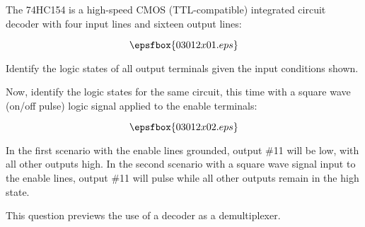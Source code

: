 

The 74HC154 is a high-speed CMOS (TTL-compatible) integrated circuit decoder with four input lines and sixteen output lines:

$$\epsfbox{03012x01.eps}$$

Identify the logic states of all output terminals given the input conditions shown.

\vskip 10pt

Now, identify the logic states for the same circuit, this time with a square wave (on/off pulse) logic signal applied to the enable terminals:

$$\epsfbox{03012x02.eps}$$







In the first scenario with the enable lines grounded, output \#11 will be low, with all other outputs high.  In the second scenario with a square wave signal input to the enable lines, output \#11 will pulse while all other outputs remain in the high state.







This question previews the use of a decoder as a demultiplexer.




